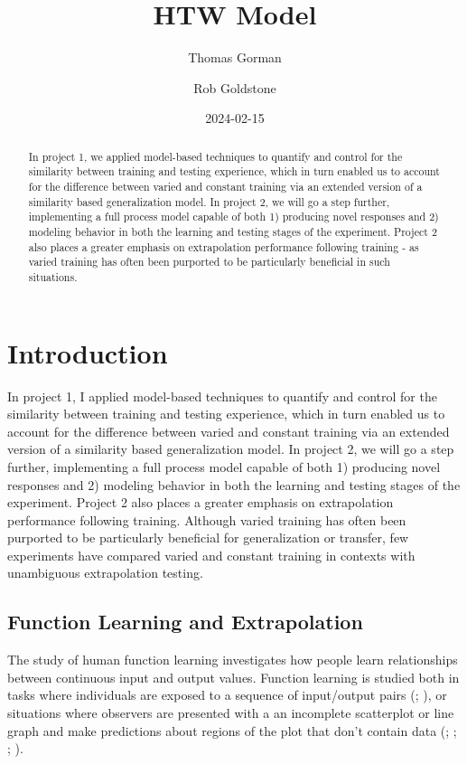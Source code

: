 \documentclass[
  letterpaper,
  DIV=11,
  numbers=noendperiod,
  oneside]{scrartcl}
\title{HTW Model}
\author{Thomas Gorman \and Rob Goldstone}
\date{2024-02-15}
\begin{document}
\maketitle
\begin{abstract}
In project 1, we applied model-based techniques to quantify and control
for the similarity between training and testing experience, which in
turn enabled us to account for the difference between varied and
constant training via an extended version of a similarity based
generalization model. In project 2, we will go a step further,
implementing a full process model capable of both 1) producing novel
responses and 2) modeling behavior in both the learning and testing
stages of the experiment. Project 2 also places a greater emphasis on
extrapolation performance following training - as varied training has
often been purported to be particularly beneficial in such situations.
\end{abstract}

\section{Introduction}\label{introduction}

In project 1, I applied model-based techniques to quantify and control
for the similarity between training and testing experience, which in
turn enabled us to account for the difference between varied and
constant training via an extended version of a similarity based
generalization model. In project 2, we will go a step further,
implementing a full process model capable of both 1) producing novel
responses and 2) modeling behavior in both the learning and testing
stages of the experiment. Project 2 also places a greater emphasis on
extrapolation performance following training. Although varied training
has often been purported to be particularly beneficial for
generalization or transfer, few experiments have compared varied and
constant training in contexts with unambiguous extrapolation testing.

\subsection{Function Learning and
Extrapolation}\label{function-learning-and-extrapolation}

The study of human function learning investigates how people learn
relationships between continuous input and output values. Function
learning is studied both in tasks where individuals are exposed to a
sequence of input/output pairs
(;
),
or situations where observers are presented with a an incomplete
scatterplot or line graph and make predictions about regions of the plot
that don't contain data
(; ; ;
).
\end{document}
